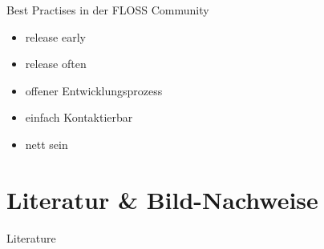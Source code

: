 \begin{frame}{Best Practises in der FLOSS Community}
	\begin{itemize}
		\item release early
		\item release often
		\item offener Entwicklungsprozess
		\item einfach Kontaktierbar
		\item nett sein
	\end{itemize}
\end{frame}

\section{Literatur \& Bild-Nachweise}
\begin{frame}[allowframebreaks]{Literature}
	\tiny{
		
	}
\end{frame}
